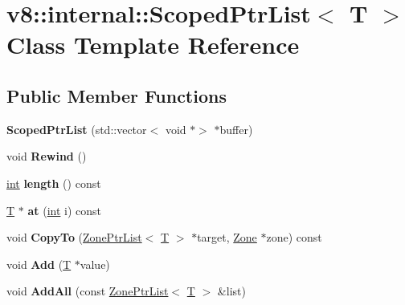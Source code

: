 \hypertarget{classv8_1_1internal_1_1ScopedPtrList}{}\section{v8\+:\+:internal\+:\+:Scoped\+Ptr\+List$<$ T $>$ Class Template Reference}
\label{classv8_1_1internal_1_1ScopedPtrList}
\subsection*{Public Member Functions}
\begin{DoxyCompactItemize}
\item 
\mbox{\label{classv8_1_1internal_1_1ScopedPtrList_ae5557d753946b76eb73b00e98e42eb50}} 
{\bfseries Scoped\+Ptr\+List} (std\+::vector$<$ void $\ast$$>$ $\ast$buffer)
\item 
\mbox{\label{classv8_1_1internal_1_1ScopedPtrList_aa466cbab5a53cf2a94950f151017bd05}} 
void {\bfseries Rewind} ()
\item 
\mbox{\label{classv8_1_1internal_1_1ScopedPtrList_a5e31149bdc1e88dfaef4e75fd1467ad1}} 
\mbox{\hyperlink{classint}{int}} {\bfseries length} () const
\item 
\mbox{\label{classv8_1_1internal_1_1ScopedPtrList_ae9d09e3474437b1079cf667170933ab3}} 
\mbox{\hyperlink{classv8_1_1internal_1_1torque_1_1T}{T}} $\ast$ {\bfseries at} (\mbox{\hyperlink{classint}{int}} i) const
\item 
\mbox{\label{classv8_1_1internal_1_1ScopedPtrList_a343d61c535097d91cf00a97933867070}} 
void {\bfseries Copy\+To} (\mbox{\hyperlink{classv8_1_1internal_1_1ZoneList}{Zone\+Ptr\+List}}$<$ \mbox{\hyperlink{classv8_1_1internal_1_1torque_1_1T}{T}} $>$ $\ast$target, \mbox{\hyperlink{classv8_1_1internal_1_1Zone}{Zone}} $\ast$zone) const
\item 
\mbox{\label{classv8_1_1internal_1_1ScopedPtrList_a106fd179bd421e9ec8b197071063e9b6}} 
void {\bfseries Add} (\mbox{\hyperlink{classv8_1_1internal_1_1torque_1_1T}{T}} $\ast$value)
\item 
\mbox{\label{classv8_1_1internal_1_1ScopedPtrList_a153fcaf01d66acf3229a28e560c32e21}} 
void {\bfseries Add\+All} (const \mbox{\hyperlink{classv8_1_1internal_1_1ZoneList}{Zone\+Ptr\+List}}$<$ \mbox{\hyperlink{classv8_1_1internal_1_1torque_1_1T}{T}} $>$ \&list)
\end{DoxyCompactItemize}


